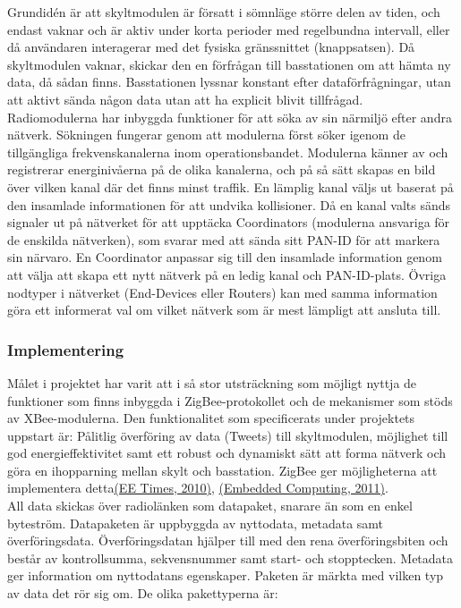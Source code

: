 \documentclass[a4paper,11pt]{article}
\begin{document}
Grundidén är att skyltmodulen är försatt i sömnläge större delen av tiden, och endast vaknar och är aktiv under korta perioder med regelbundna intervall, eller då användaren interagerar med det fysiska gränssnittet (knappsatsen). Då skyltmodulen vaknar, skickar den en förfrågan till basstationen om att hämta ny data, då sådan finns. Basstationen lyssnar konstant efter dataförfrågningar, utan att aktivt sända någon data utan att ha explicit blivit tillfrågad. \\

Radiomodulerna har inbyggda funktioner för att söka av sin närmiljö efter andra nätverk. Sökningen fungerar genom att modulerna först söker igenom de tillgängliga frekvenskanalerna inom operationsbandet. Modulerna känner av och registrerar energinivåerna på de olika kanalerna, och på så sätt skapas en bild över vilken kanal där det finns minst traffik. En lämplig kanal väljs ut baserat på den insamlade informationen för att undvika kollisioner. Då en kanal valts sänds signaler ut på nätverket för att upptäcka Coordinators (modulerna ansvariga för de enskilda nätverken), som svarar med att sända sitt PAN-ID för att markera sin närvaro. En Coordinator anpassar sig till den insamlade information genom att välja att skapa ett nytt nätverk på en ledig kanal och PAN-ID-plats. Övriga nodtyper i nätverket (End-Devices eller Routers) kan med samma information göra ett informerat val om vilket nätverk som är mest lämpligt att ansluta till.

\subsubsection{Implementering}
Målet i projektet har varit att i så stor utsträckning som möjligt nyttja de funktioner som finns inbyggda i ZigBee-protokollet och de mekanismer som stöds av XBee-modulerna.
Den funktionalitet som specificerats under projektets uppstart är: Pålitlig överföring av data (Tweets) till skyltmodulen, möjlighet till god energieffektivitet samt ett robust och dynamiskt sätt att forma nätverk och göra en ihopparning mellan skylt och basstation. ZigBee ger möjligheterna att implementera detta\hyperref[eetimes]{(EE Times, 2010)},  \hyperref[embedded]{(Embedded Computing, 2011)}. \\

All data skickas över radiolänken som datapaket, snarare än som en enkel byteström. Datapaketen är uppbyggda av nyttodata, metadata samt överföringsdata. Överföringsdatan hjälper till med den rena överföringsbiten och består av kontrollsumma, sekvensnummer samt start- och stopptecken. Metadata ger information om nyttodatans egenskaper.
Paketen är märkta med vilken typ av data det rör sig om. De olika pakettyperna är:
\end{document}
